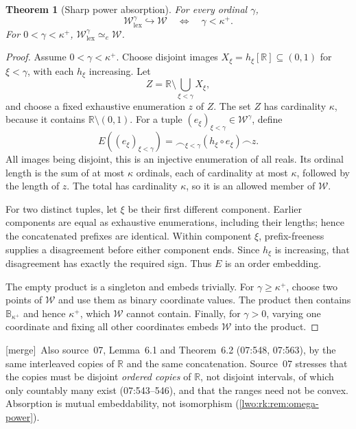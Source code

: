 \documentclass[11pt,a4paper]{article}
\newtheorem{theorem}{Theorem}[section]
\theoremstyle{definition}
\theoremstyle{remark}
\newcommand{\R}{\mathbb R}
\newcommand{\W}{\mathcal W}
\newcommand{\B}{\mathbb B}
\newcommand{\lex}{\mathrm{lex}}
\newcommand{\cat}{\mathbin{\frown}}
\newcommand{\emb}{\hookrightarrow}
\newcommand{\equi}{\mathrel{\simeq_{\!e}}}
\newcommand{\merge}{\textsf{[merge]}}
\begin{document}
\begin{theorem}[Sharp power absorption]\label{lwo:thm:absorption}
For every ordinal $\gamma$,
\begin{equation}\label{lwo:eq:absorption}
                       \W^\gamma_{\lex}\emb\W
                       \quad\Longleftrightarrow\quad\gamma<\kappa^+.
\end{equation}
For $0<\gamma<\kappa^+$, $\W^\gamma_{\lex}\equi\W$.
\end{theorem}
\begin{proof}
Assume $0<\gamma<\kappa^+$. Choose disjoint images
$X_\xi=h_\xi[\R]\subseteq(0,1)$ for $\xi<\gamma$, with each $h_\xi$
increasing. Let
\[
                  Z=\R\setminus\bigcup_{\xi<\gamma}X_\xi,
\]
and choose a fixed exhaustive enumeration $z$ of $Z$. The set $Z$ has
cardinality $\kappa$, because it contains $\R\setminus(0,1)$.
For a tuple $(e_\xi)_{\xi<\gamma}\in\W^\gamma$, define
\begin{equation}\label{lwo:eq:concatenation}
 E((e_\xi)_{\xi<\gamma})
       =\mathop{\cat}_{\xi<\gamma}(h_\xi\circ e_\xi)\cat z.
\end{equation}
All images being disjoint, this is an injective enumeration of all reals.
Its ordinal length is the sum of at most $\kappa$ ordinals, each of
cardinality at most $\kappa$, followed by the length of $z$. The total has
cardinality $\kappa$, so it is an allowed member of $\W$.

For two distinct tuples, let $\xi$ be their first different component.
Earlier components are equal as exhaustive enumerations, including their
lengths; hence the concatenated prefixes are identical. Within component
$\xi$, prefix-freeness supplies a disagreement before either component
ends. Since $h_\xi$ is increasing, that disagreement has exactly the
required sign. Thus $E$ is an order embedding.

The empty product is a singleton and embeds trivially. For
$\gamma\geq\kappa^+$, choose two points of $\W$ and use them as binary
coordinate values. The product then contains $\B_{\kappa^+}$ and hence
$\kappa^+$, which $\W$ cannot contain. Finally, for $\gamma>0$, varying one
coordinate and fixing all other coordinates embeds $\W$ into the product.
\end{proof}
\merge\ Also source~07, Lemma~6.1 and Theorem~6.2 (07:548, 07:563), by
the same interleaved copies of $\R$ and the same concatenation. Source~07
stresses that the copies must be disjoint \emph{ordered copies} of $\R$, not
disjoint intervals, of which only countably many exist (07:543--546), and that
the ranges need not be convex. Absorption is mutual embeddability, not
isomorphism (\cref{lwo:rk:rem:omega-power}).
\end{document}
